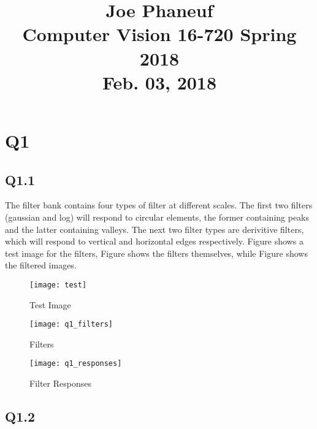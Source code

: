 \documentclass[12pt]{article}
\begin{document}
\title{Joe Phaneuf \\ Computer Vision 16-720 Spring 2018 \\ Feb. 03, 2018 }
\date{}
\author{}
\maketitle

\newpage


\section{Q1}
\subsection{Q1.1}

The filter bank contains four types of filter at different scales. The first two filters (gaussian and log) will respond to circular elements, the former containing peaks and the latter containing valleys.
The next two filter types are derivitive filters, which will respond to vertical and horizontal edges respectively.
Figure \label{fig:test_image} shows a test image for the filters, Figure shows \label{fig:filters} the filters themselves, while Figure \label{fig:filter_responses} shows the filtered images.

\begin{figure}[H]
\centering
\texttt{[image: test]}
\caption{Test Image}    
\label{fig:test_image}
\end{figure}   

\begin{figure}[H]
\centering
\texttt{[image: q1\_filters]}
\caption{Filters}    
\label{fig:filters}
\end{figure}   

\begin{figure}[H]
\centering
\texttt{[image: q1\_responses]}
\caption{Filter Responses}    
\label{fig:filter_responses}
\end{figure}   

\newpage
\subsection{Q1.2}
\end{document}
